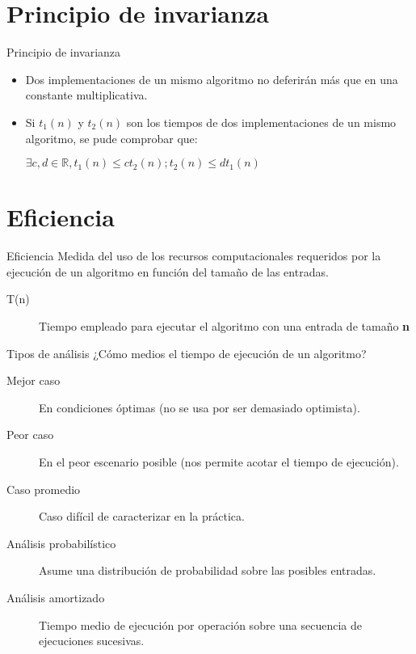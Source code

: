 \section{Principio de invarianza}

\begin{frame}[c]{Principio de invarianza}
  \begin{itemize}
    \item Dos implementaciones de un mismo algoritmo no deferirán más
      que en una constante multiplicativa.
    \pausa
    \item Si $t_1(n)$ y $t_2(n)$ son los tiempos de dos implementaciones
      de un mismo algoritmo, se pude comprobar que:

      \vspace{\baselineskip}
      $\exists c,d \in \mathbb{R}, t_1(n) \leq ct_2(n); t_2(n) \leq dt_1(n)$
  \end{itemize}
\end{frame}

\section{Eficiencia}

\begin{frame}[c]{Eficiencia}
  Medida del uso de los recursos computacionales
  requeridos por la ejecución de un algoritmo en función
  del tamaño de las entradas.

  \vspace{\baselineskip}
  \begin{description}
    \item[T(n)] Tiempo empleado para ejecutar el algoritmo con una entrada
      de tamaño \textbf{n}
  \end{description}
\end{frame}

\begin{frame}[c]{Tipos de análisis}
  ¿Cómo medios el tiempo de ejecución de un algoritmo?

  \vspace{\baselineskip}
  \begin{description}
    \item[Mejor caso] En condiciones óptimas (no se usa por ser
      demasiado optimista).
    \pausa
    \item[Peor caso] En el peor escenario posible (nos permite acotar
      el tiempo de ejecución).
    \pausa
    \item[Caso promedio] Caso difícil de caracterizar en la práctica.
    \pausa
    \item[Análisis probabilístico] Asume una distribución de probabilidad
      sobre las posibles entradas.
    \pausa
    \item[Análisis amortizado] Tiempo medio de ejecución por operación
      sobre una secuencia de ejecuciones sucesivas.
  \end{description}
\end{frame}

